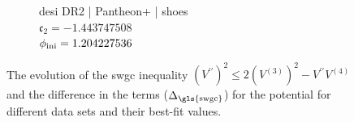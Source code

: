 \begin{figure}[htbp]
    \vspace{0.35em}

    \hspace*{\fill}
    \begin{subfigure}[t]{0.40\textwidth}
        \centering
        \resizebox{\linewidth}{!}{%
        }
        \caption{\gls{desi} DR2 | Pantheon+ | \gls{shoes}\\$\mathfrak{c}_2 = -1.443747508$\\$\phi_{\textnormal{ini}} = 1.204227536$}
        \label{fig:HyperbolicSWGC:PPSD}
    \end{subfigure}
    \hspace*{\fill}

    \tagstructend
    \caption[SWGC evolution]{The evolution of the \gls{swgc} inequality $\left(V^{\prime\prime}\right)^2\leq2\left(V^{\left(3\right)}\right)^2 - V^{\prime\prime}V^{\left(4\right)}$ and the difference in the terms ($\Delta_{\textnormal{\gls{swgc}}}$) for the  potential for different data sets and their best-fit values.}
    \label{fig:HyperbolicSWGC}
\end{figure}